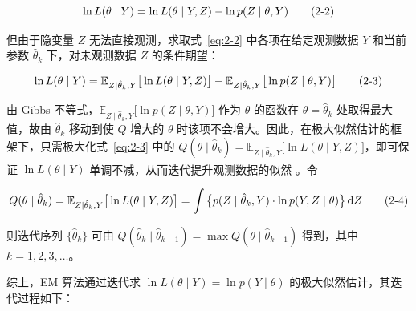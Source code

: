 \documentclass[12pt,a4paper]{ctexart}
\makeatletter
\numberwithin{figure}{section}
\numberwithin{table}{section}
\let\ltx@orig@tag\tag
\renewcommand{\tag}[1]{\refstepcounter{equation}\ltx@orig@tag{#1}}%
\makeatother
\begin{document}
\begin{equation}
\ln L(\theta\mid Y) = \ln L(\theta\mid Y,Z) - \ln p(Z\mid\theta,Y) \tag{2-2}\label{eq:2-2}
\end{equation}

但由于隐变量 $Z$ 无法直接观测，求取式~\eqref{eq:2-2} 中各项在给定观测数据 $Y$ 和当前参数 $\hat{\theta}_k$ 下，对未观测数据 $Z$ 的条件期望：

\begin{equation}
\ln L(\theta\mid Y) = \mathbb{E}_{Z\mid\hat{\theta}_k,Y}\big[\ln L(\theta\mid Y,Z)\big] - \mathbb{E}_{Z\mid\hat{\theta}_k,Y}\big[\ln p(Z\mid\theta,Y)\big] \tag{2-3}\label{eq:2-3}
\end{equation}

由 Gibbs 不等式，$\mathbb{E}_{Z\mid\hat{\theta}_k,Y}\big[\ln p(Z\mid\theta,Y)\big]$ 作为 $\theta$ 的函数在 $\theta=\hat{\theta}_k$ 处取得最大值，故由 $\hat{\theta}_k$ 移动到使 $Q$ 增大的 $\theta$ 时该项不会增大。因此，在极大似然估计的框架下，只需极大化式~\eqref{eq:2-3} 中的 $Q(\theta\mid\hat{\theta}_k)=\mathbb{E}_{Z\mid\hat{\theta}_k,Y}\big[\ln L(\theta\mid Y,Z)\big]$，即可保证 $\ln L(\theta\mid Y)$ 单调不减，从而迭代提升观测数据的似然 \textsuperscript{\cite{ref35}}。令

\begin{equation}
Q(\theta\mid\hat{\theta}_k) = \mathbb{E}_{Z\mid\hat{\theta}_k,Y}\big[\ln L(\theta\mid Y,Z)\big] = \int \big\{ p(Z\mid\hat{\theta}_k,Y)\cdot\ln p(Y,Z\mid\theta) \big\}\, \mathrm{d}Z \tag{2-4}
\end{equation}

则迭代序列 $\{\hat{\theta}_k\}$ 可由 $Q(\hat{\theta}_k\mid\hat{\theta}_{k-1}) = \max Q(\theta\mid\hat{\theta}_{k-1})$ 得到，其中 $k = 1,2,3,\ldots$。

综上，EM 算法通过迭代求 $\ln L(\theta\mid Y) = \ln p(Y\mid\theta)$ 的极大似然估计，其迭代过程如下：
\end{document}
